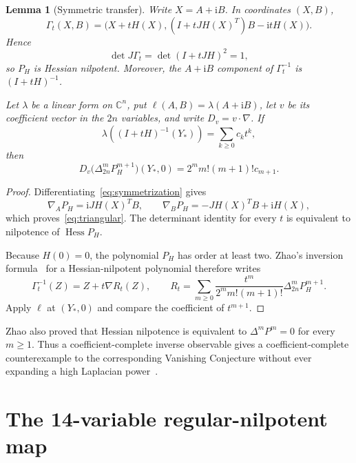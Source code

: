 \documentclass[11pt]{article}
\newtheorem{lemma}[theorem]{Lemma}
\newcommand{\C}{\mathbb C}
\newcommand{\ii}{\mathrm i}
\newcommand{\Hess}{\operatorname{Hess}}
\begin{document}
\begin{lemma}[Symmetric transfer]\label{lem:symmetric-transfer}
Write $X=A+\ii B$.  In coordinates $(X,B)$,
\begin{equation}
 \Gamma_t(X,B)=
 \bigl(X+tH(X),(I+tJH(X)^T)B-\ii tH(X)\bigr).
 \label{eq:triangular}
\end{equation}
Hence
\[
 \det J\Gamma_t=\det(I+tJH)^2=1,
\]
so $P_H$ is Hessian nilpotent.  Moreover, the $A+\ii B$ component of
$\Gamma_t^{-1}$ is $(I+tH)^{-1}$.

Let $\lambda$ be a linear form on $\C^n$, put
$\ell(A,B)=\lambda(A+\ii B)$, let $v$ be its coefficient vector in the
$2n$ variables, and write $D_v=v\mathbin{\cdot}\nabla$.  If
\[
 \lambda((I+tH)^{-1}(Y_*))=\sum_{k\ge0}c_kt^k,
\]
then
\begin{equation}
 D_v\bigl(\Delta_{2n}^mP_H^{m+1}\bigr)(Y_*,0)
 =2^m m!(m+1)!c_{m+1}.
 \label{eq:laplace-transfer}
\end{equation}
\end{lemma}

\begin{proof}
Differentiating~\eqref{eq:symmetrization} gives
\[
 \nabla_A P_H=\ii JH(X)^TB,\qquad
 \nabla_B P_H=-JH(X)^TB+\ii H(X),
\]
which proves~\eqref{eq:triangular}.  The determinant identity for every
$t$ is equivalent to nilpotence of $\Hess P_H$.

Because $H(0)=0$, the polynomial $P_H$ has order at least two.  Zhao's
inversion formula~\cite[Theorem~3.4]{zhao-hnp} for a Hessian-nilpotent
polynomial therefore writes
\begin{equation}
 \Gamma_t^{-1}(Z)=Z+t\nabla R_t(Z),\qquad
 R_t=\sum_{m\ge0}
 \frac{t^m}{2^m m!(m+1)!}\Delta_{2n}^mP_H^{m+1}.
 \label{eq:zhao}
\end{equation}
Apply $\ell$ at $(Y_*,0)$ and compare the coefficient of $t^{m+1}$.
\end{proof}

Zhao also proved that Hessian nilpotence is equivalent to
$\Delta^mP^m=0$ for every $m\ge1$.  Thus a coefficient-complete inverse
observable gives a coefficient-complete counterexample to the corresponding
Vanishing Conjecture without ever expanding a high Laplacian
power~\cite{zhao-hnp,zhao-general-vc}.

\section{The 14-variable regular-nilpotent map}
\end{document}

